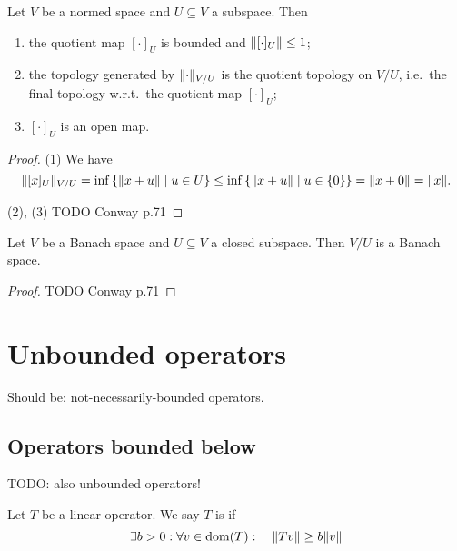 \begin{proposition}
Let $V$ be a normed space and $U\subseteq V$ a subspace. Then
\begin{enumerate}
\item the quotient map $[\cdot]_U$ is bounded and $\lVert[\cdot]_U\rVert\leq 1$;
\item the topology generated by $\lVert\cdot\rVert_{V/U}$ is the quotient topology on $V/U$, i.e.\ the final topology w.r.t.\ the quotient map $[\cdot]_U$;
\item $[\cdot]_U$ is an open map.
\end{enumerate}
\end{proposition}
\begin{proof}
(1) We have
\[ \norm{[x]_U}_{V/U} = \inf\setbuilder{\norm{x+u}}{u\in U} \leq \inf\setbuilder{\norm{x+u}}{u\in \{0\}} = \norm{x+0} = \norm{x}. \]

(2), (3) TODO Conway p.71
\end{proof}

\begin{proposition} \label{quotientBanachSpace}
Let $V$ be a Banach space and $U\subseteq V$ a closed subspace. Then $V/U$ is a Banach space.
\end{proposition}
\begin{proof}
TODO Conway p.71
\end{proof}

\section{Unbounded operators}
Should be: not-necessarily-bounded operators.
\subsection{Operators bounded below}
TODO: also unbounded operators!
\begin{definition}
Let $T$ be a linear operator. We say $T$ is  if
\[ \exists b>0:\forall v\in \operatorname{dom}(T): \quad \lVert Tv\rVert\geq b\lVert v\rVert \]
\end{definition}

